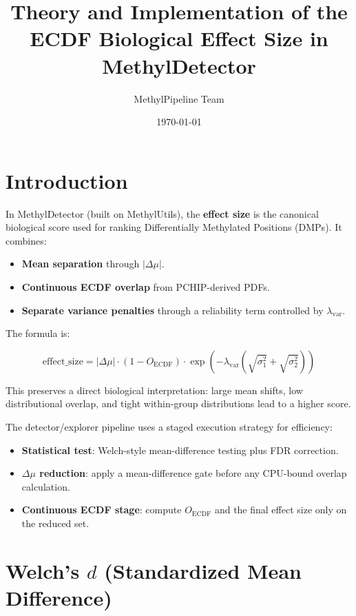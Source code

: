 \documentclass{article}
\title{Theory and Implementation of the ECDF Biological Effect Size in MethylDetector}
\author{MethylPipeline Team}
\date{\today}
\begin{document}
\maketitle

\tableofcontents
\newpage

\section{Introduction}

In MethylDetector (built on MethylUtils), the \textbf{effect size} is the canonical biological score used for ranking Differentially Methylated Positions (DMPs). It combines:

\begin{itemize}
    \item \textbf{Mean separation} through $|\Delta \mu|$.
    \item \textbf{Continuous ECDF overlap} from PCHIP-derived PDFs.
    \item \textbf{Separate variance penalties} through a reliability term controlled by $\lambda_{\mathrm{var}}$.
\end{itemize}

The formula is:

\begin{equation}
    \mathrm{effect\_size}
    =
    |\Delta \mu|
    \cdot
    (1 - O_{\mathrm{ECDF}})
    \cdot
    \exp\left(-\lambda_{\mathrm{var}} (\sqrt{\sigma_1^2} + \sqrt{\sigma_2^2})\right)
\end{equation}

This preserves a direct biological interpretation: large mean shifts, low distributional overlap, and tight within-group distributions lead to a higher score.

The detector/explorer pipeline uses a staged execution strategy for efficiency:

\begin{itemize}
    \item \textbf{Statistical test}: Welch-style mean-difference testing plus FDR correction.
    \item \textbf{$\Delta \mu$ reduction}: apply a mean-difference gate before any CPU-bound overlap calculation.
    \item \textbf{Continuous ECDF stage}: compute $O_{\mathrm{ECDF}}$ and the final effect size only on the reduced set.
\end{itemize}

\section{Welch's $d$ (Standardized Mean Difference)}
\end{document}
